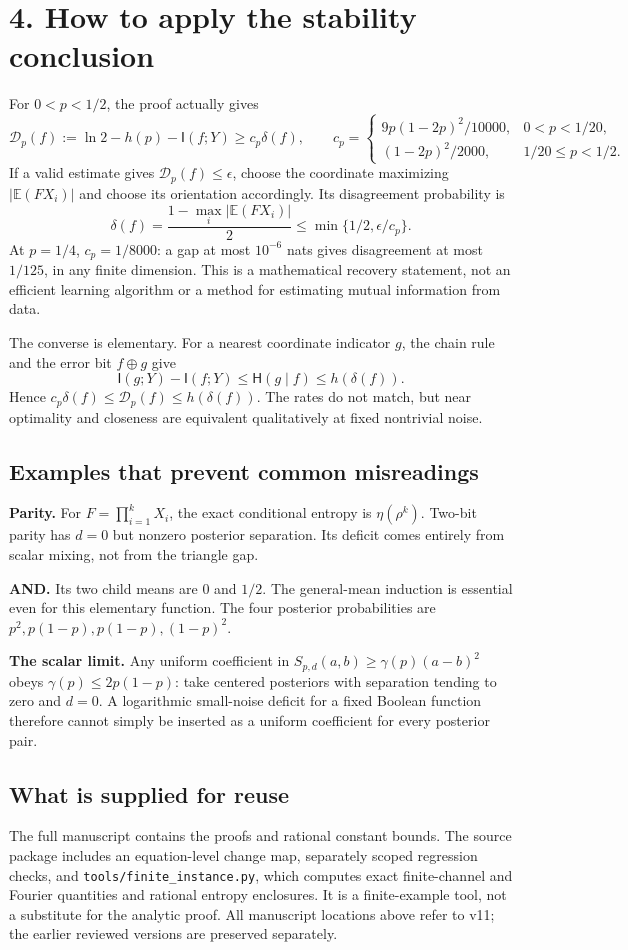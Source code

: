 \documentclass[11pt]{article}
\newcommand{\E}{\mathbb E}\newcommand{\Pp}{\mathbb P}\newcommand{\HH}{\mathsf H}\newcommand{\II}{\mathsf I}
\begin{document}
\section*{4. How to apply the stability conclusion}
For $0<p<1/2$, the proof actually gives
\[
 \mathcal D_p(f):=\ln2-h(p)-\II(f;Y)\ge c_p\delta(f),\qquad
 c_p=\begin{cases}
 9p(1-2p)^2/10000,&0<p<1/20,\\
 (1-2p)^2/2000,&1/20\le p<1/2.
 \end{cases}
\]
If a valid estimate gives $\mathcal D_p(f)\le\epsilon$, choose the coordinate maximizing $|\E(FX_i)|$ and choose its orientation accordingly. Its disagreement probability is
\[
 \delta(f)=\frac{1-\max_i|\E(FX_i)|}{2}
 \le\min\{1/2,\epsilon/c_p\}.
\]
At $p=1/4$, $c_p=1/8000$: a gap at most $10^{-6}$ nats gives disagreement at most $1/125$, in any finite dimension. This is a mathematical recovery statement, not an efficient learning algorithm or a method for estimating mutual information from data.

The converse is elementary. For a nearest coordinate indicator $g$, the chain rule and the error bit $f\oplus g$ give
\[
 \II(g;Y)-\II(f;Y)\le\HH(g\mid f)\le h(\delta(f)).
\]
Hence $c_p\delta(f)\le\mathcal D_p(f)\le h(\delta(f))$. The rates do not match, but near optimality and closeness are equivalent qualitatively at fixed nontrivial noise.

\subsection*{Examples that prevent common misreadings}
\textbf{Parity.} For $F=\prod_{i=1}^kX_i$, the exact conditional entropy is $\eta(\rho^k)$. Two-bit parity has $d=0$ but nonzero posterior separation. Its deficit comes entirely from scalar mixing, not from the triangle gap.

\textbf{AND.} Its two child means are $0$ and $1/2$. The general-mean induction is essential even for this elementary function. The four posterior probabilities are $p^2,p(1-p),p(1-p),(1-p)^2$.

\textbf{The scalar limit.} Any uniform coefficient in
$S_{p,d}(a,b)\ge\gamma(p)(a-b)^2$ obeys $\gamma(p)\le2p(1-p)$: take centered posteriors with separation tending to zero and $d=0$. A logarithmic small-noise deficit for a fixed Boolean function therefore cannot simply be inserted as a uniform coefficient for every posterior pair.

\subsection*{What is supplied for reuse}
The full manuscript contains the proofs and rational constant bounds. The source package includes an equation-level change map, separately scoped regression checks, and \texttt{tools/finite\_instance.py}, which computes exact finite-channel and Fourier quantities and rational entropy enclosures. It is a finite-example tool, not a substitute for the analytic proof. All manuscript locations above refer to v11; the earlier reviewed versions are preserved separately.
\end{document}
